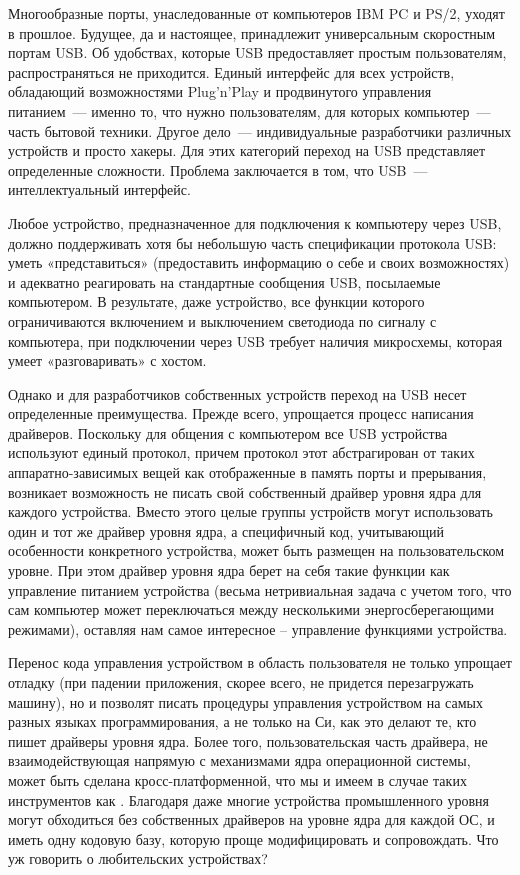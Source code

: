 \secdown

Многообразные порты, унаследованные от компьютеров IBM PC и PS/2, уходят в
прошлое. Будущее, да и настоящее, принадлежит универсальным скоростным портам
USB. Об удобствах, которые USB предоставляет простым пользователям,
распространяться не приходится. Единый интерфейс для всех устройств, обладающий
возможностями Plug’n’Play и продвинутого управления питанием\ --- именно то, что
нужно пользователям, для которых компьютер\ --- часть бытовой техники.
Другое дело\ --- индивидуальные разработчики различных устройств и просто
хакеры. Для этих категорий переход на USB представляет определенные сложности.
Проблема заключается в том, что USB\ --- интеллектуальный интерфейс.

Любое устройство, предназначенное для подключения к компьютеру через USB, должно
поддерживать хотя бы небольшую часть спецификации протокола USB: уметь
«представиться» (предоставить информацию о себе и своих возможностях) и
адекватно реагировать на стандартные сообщения USB, посылаемые компьютером. В
результате, даже устройство, все функции которого ограничиваются включением и
выключением светодиода по сигналу с компьютера, при подключении через USB
требует наличия микросхемы, которая умеет «разговаривать» с хостом. 

Однако и для
разработчиков собственных устройств переход на USB несет определенные
преимущества. Прежде всего, упрощается процесс написания драйверов. Поскольку
для общения с компьютером все USB устройства используют единый протокол, причем
протокол этот абстрагирован от таких аппаратно-зависимых вещей как отображенные
в память порты и прерывания, возникает возможность не писать свой собственный
драйвер уровня ядра для каждого устройства. Вместо этого целые группы устройств
могут использовать один и тот же драйвер уровня ядра, а специфичный код,
учитывающий особенности конкретного устройства, может быть размещен на
пользовательском уровне. При этом драйвер уровня ядра берет на себя такие
функции как управление питанием устройства (весьма нетривиальная задача с учетом
того, что сам компьютер может переключаться между несколькими энергосберегающими
режимами), оставляя нам самое интересное – управление функциями устройства.

Перенос кода управления устройством в область пользователя не только упрощает
отладку (при падении приложения, скорее всего, не придется перезагружать
машину), но и позволят писать процедуры управления устройством на самых разных
языках программирования, а не только на Си, как это делают те, кто пишет
драйверы уровня ядра. Более того, пользовательская часть драйвера, не
взаимодействующая напрямую с механизмами ядра операционной системы, может быть
сделана кросс-платформенной, что мы и имеем в случае таких инструментов как
. Благодаря  даже многие устройства промышленного
уровня могут обходиться без собственных драйверов на уровне ядра для каждой ОС,
и иметь одну кодовую базу, которую проще модифицировать и сопровождать.
Что уж говорить о любительских устройствах?



\secup
